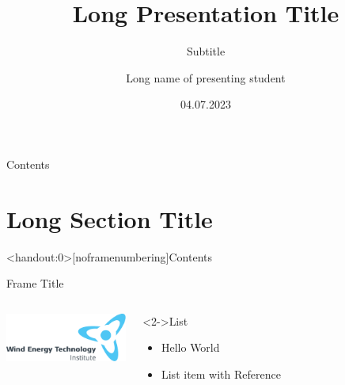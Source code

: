 \documentclass[aspectratio=1610,handout]{beamer} %
\title[Short Presentation Title]{Long Presentation Title}
\institute[WETI]{Wind Energy Technology Institute}
\author[Short name]{Long name of presenting student}
\date{04.07.2023}
\subtitle{Subtitle}
\begin{document}
\maketitle
\section[Introduction]{}
\begin{frame}{Contents}
	\tableofcontents
\end{frame}
\section[Short Section Title]{Long Section Title}
\miniframesoff
\begin{frame}<handout:0>[noframenumbering]{Contents}
	\tableofcontents[currentsection]
\end{frame}
\miniframeson
\begin{frame}{Frame Title}
\begin{columns}
	\column{4.0cm}    	
		\centering 
		\includegraphics<1->[width=4cm]{Figures/WETI}
	\column{10.0cm}
		\begin{block}<2->{List}
			\begin{itemize}		
				\item Hello World
				\item List item with Reference \cite{Bossanyi2000a}
			\end{itemize} 	
		\end{block}  
\end{columns}
\end{frame}
\end{document}
